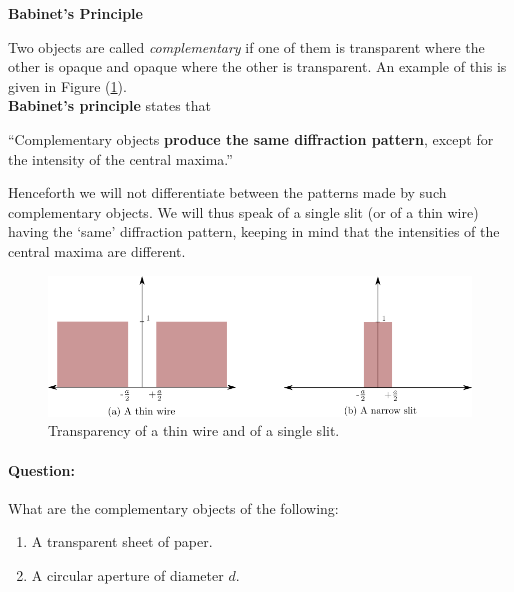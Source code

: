 \begin{imp}

\begin{center}
    \textbf{Babinet's Principle}
\end{center}

Two objects are called \textit{complementary} if one of them is transparent where the other is opaque and opaque where the other is transparent. An example of this is given in Figure (\ref{fig:complementary}).~\\

\textbf{Babinet's principle} states that

\begin{center}
``Complementary objects \textbf{produce the same diffraction pattern}, except for the intensity of the central maxima.''
\end{center}


Henceforth we will not differentiate between the patterns made by such complementary objects. We will thus speak of a single slit (or of a thin wire) having the `same' diffraction pattern, keeping in mind that the intensities of the central maxima are different.
\end{imp}

\begin{figure}[!htb]
    \centering
    \includegraphics[scale=0.6]{figs/complementary.png}
    \caption{Transparency of a thin wire and of a single slit.}
    \label{fig:complementary}
\end{figure}

\begin{question}
\paragraph{Question:} What are the complementary objects of the following:

\begin{enumerate}
\item A transparent sheet of paper.
\item A circular aperture of diameter $d$.
\end{enumerate}
\end{question}



